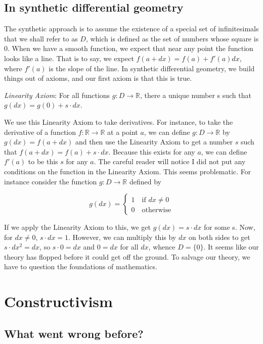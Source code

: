 \documentclass[]{book}
\begin{document}
\subsection{In synthetic differential geometry}

The synthetic approach is to assume the existence of a special set of infinitesimals that we shall refer to as $D$, which is defined as the set of numbers whose square is 0. When we have a smooth function, we expect that near any point the function looks like a line. That is to say, we expect $f(a + dx) = f(a) + f'(a)dx$, where $f'(a)$ is the slope of the line. In synthetic differential geometry, we build things out of axioms, and our first axiom is that this is true.

\emph{Linearity Axiom}: For all functions $g : D \to \mathbb{R}$, there a unique number s such that $g(dx) = g(0) + s \cdot dx$.

We use this Linearity Axiom to take derivatives. For instance, to take the derivative of a function $f: \mathbb{R} \to \mathbb{R}$ at a point $a$, we can define $g : D \to \mathbb{R}$ by $g(dx) = f(a + dx)$ and then use the Linearity Axiom to get a number $s$ such that $f(a + dx) = f(a) + s \cdot dx$. Because this exists for any $a$, we can define $f'(a)$ to be this $s$ for any $a$. The careful reader will notice I did not put any conditions on the function in the Linearity Axiom. This seems problematic. For instance consider the function $g : D \to \mathbb{R}$ defined by

\[ g(dx) = \begin{cases} 1 \quad \text{if $dx \neq 0$} \\ 0 \quad \text{otherwise} \end{cases} \]

If we apply the Linearity Axiom to this, we get $g(dx) = s \cdot dx$ for some s. Now, for $dx \neq 0$, $s \cdot dx = 1$. However, we can multiply this by $dx$ on both sides to get $s \cdot dx^2 = dx$, so $s \cdot 0 = dx$ and $0 = dx$ for all $dx$, whence $D = \{0\}$.  It seems like our theory has flopped before it could get off the ground.  To salvage our theory, we have to question the foundations of mathematics.

\section{Constructivism}

\subsection{What went wrong before?}
\end{document}
